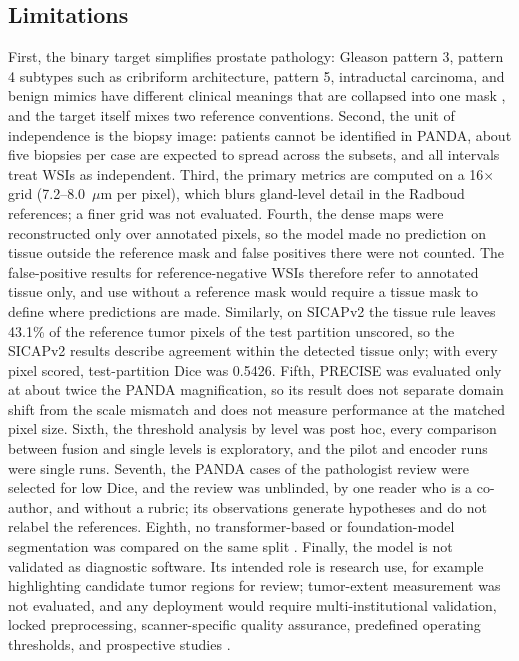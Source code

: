 \documentclass[10pt,letterpaper]{article}
\begin{document}
\subsection*{Limitations}
First, the binary target simplifies prostate pathology: Gleason pattern 3, pattern 4 subtypes such as cribriform architecture, pattern 5, intraductal carcinoma, and benign mimics have different clinical meanings that are collapsed into one mask \cite{bib3,bib4,bib5}, and the target itself mixes two reference conventions. Second, the unit of independence is the biopsy image: patients cannot be identified in PANDA, about five biopsies per case are expected to spread across the subsets, and all intervals treat WSIs as independent. Third, the primary metrics are computed on a 16$\times$ grid (7.2--8.0~$\mu$m per pixel), which blurs gland-level detail in the Radboud references; a finer grid was not evaluated. Fourth, the dense maps were reconstructed only over annotated pixels, so the model made no prediction on tissue outside the reference mask and false positives there were not counted. The false-positive results for reference-negative WSIs therefore refer to annotated tissue only, and use without a reference mask would require a tissue mask to define where predictions are made. Similarly, on SICAPv2 the tissue rule leaves 43.1\% of the reference tumor pixels of the test partition unscored, so the SICAPv2 results describe agreement within the detected tissue only; with every pixel scored, test-partition Dice was 0.5426. Fifth, PRECISE was evaluated only at about twice the PANDA magnification, so its result does not separate domain shift from the scale mismatch and does not measure performance at the matched pixel size. Sixth, the threshold analysis by level was post hoc, every comparison between fusion and single levels is exploratory, and the pilot and encoder runs were single runs. Seventh, the PANDA cases of the pathologist review were selected for low Dice, and the review was unblinded, by one reader who is a co-author, and without a rubric; its observations generate hypotheses and do not relabel the references. Eighth, no transformer-based or foundation-model segmentation was compared on the same split \cite{bib48,bib49,bib50,bib57,bib58}. Finally, the model is not validated as diagnostic software. Its intended role is research use, for example highlighting candidate tumor regions for review; tumor-extent measurement was not evaluated, and any deployment would require multi-institutional validation, locked preprocessing, scanner-specific quality assurance, predefined operating thresholds, and prospective studies \cite{bib51,bib52}.
\end{document}

